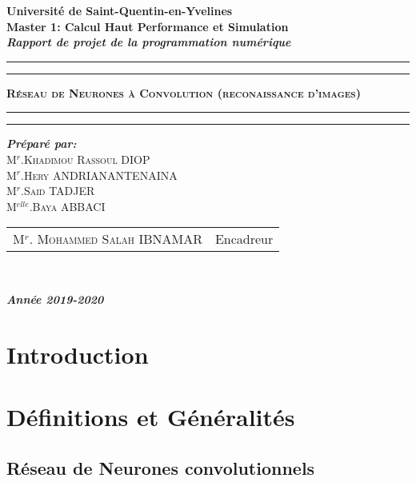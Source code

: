\documentclass[a4paper,12pt]{report}
\begin{document}
\begin{center}
{\Large {\bf Université de Saint-Quentin-en-Yvelines}}\\
{\Large {\bf {Master 1: Calcul Haut Performance et Simulation }}}\\
 \textbf{{\Huge  \textit{Rapport de projet de la programmation numérique}}} \\
\hrule
\hrule
{}
{\Huge \textbf{\textsc{ Réseau de Neurones à Convolution (reconaissance d’images) }}}\\
\hrule
\hrule
{}
{\textbf{\textit {Préparé par:}}}\\
{\large\textsc{M$^{r}$.Khadimou Rassoul DIOP}}\\
{\large\textsc{M$^{r}$.Hery ANDRIANANTENAINA}}\\
{\large\textsc{M$^{r}$.Said TADJER }}\\
{\large\textsc{M$^{elle}$.Baya ABBACI}}\\
{\large
\begin{tabular}{ll}
M$^{r}$. \textsc{Mohammed Salah} IBNAMAR  & Encadreur    \\
\end{tabular}
}\\

{\Large\textbf{\textit{ Année 2019-2020}}}
\end{center}

\tableofcontents

\chapter*{Introduction}




\chapter{Définitions et Généralités}
\section{Réseau de Neurones convolutionnels}
\end{document}
